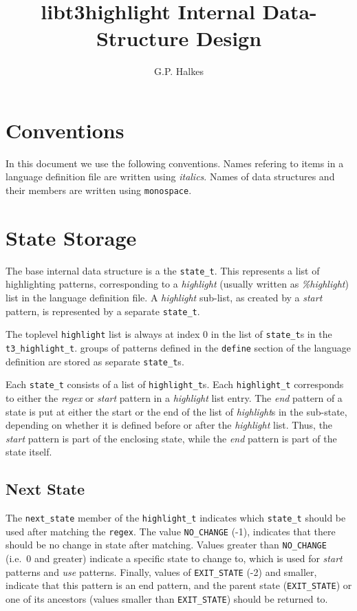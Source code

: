 \documentclass[a4paper,twocolumn]{article}
\title{libt3highlight Internal Data-Structure Design}
\author{G.P. Halkes}
\date{}
\newcommand{\state}{{\tt state_t}\xspace}
\newcommand{\highlight}{{\tt highlight_t}\xspace}
\begin{document}
\maketitle

\section{Conventions}
In this document we use the following conventions. Names refering to items in a
language definition file are written using {\it italics}. Names of data
structures and their members are written using {\tt monospace}.

\section{State Storage}
The base internal data structure is a the \state. This
represents a list of highlighting patterns, corresponding to a
{\it highlight} (usually written as {\it \%highlight}) list in the
language definition file. A {\it highlight} sub-list, as created by a
{\it start} pattern, is represented by a separate \state.

The toplevel {\tt highlight} list is always at index 0 in the list of \state{}s
in the {\tt t3_highlight_t}. groups of patterns defined in the {\tt define}
section of the language definition are stored as separate \state{}s.

Each \state consists of a list of \highlight{}s. Each \highlight corresponds to
either the {\it regex} or {\it start} pattern in a {\it highlight} list entry.
The {\it end} pattern of a state is put at either the start or the end of the
list of {\it highlight}s in the sub-state, depending on whether it is defined
before or after the {\it highlight} list. Thus, the {\it start} pattern is part
of the enclosing state, while the {\it end} pattern is part of the state itself.

\subsection{Next State}
The {\tt next_state} member of the \highlight indicates which \state should be
used after matching the {\tt regex}. The value {\tt NO_CHANGE} (-1), indicates
that there should be no change in state after matching. Values greater than
{\tt NO_CHANGE} (i.e.\ 0 and greater) indicate a specific state to change to,
which is used for {\it start} patterns and {\it use} patterns. Finally, values
of {\tt EXIT_STATE} (-2) and smaller, indicate that this pattern is an end
pattern, and the parent state ({\tt EXIT_STATE}) or one of its ancestors
(values smaller than {\tt EXIT_STATE}) should be returned to.
\end{document}
